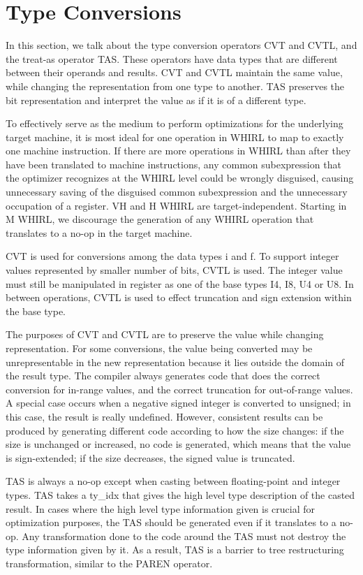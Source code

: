 \documentclass{article}
\begin{document}
\section{Type Conversions}

In this section, we talk about the type conversion operators CVT
and CVTL, and the treat-as operator TAS. These operators have data
types that are different between their operands and results.
CVT and CVTL maintain the same value, while changing the representation
from one type to another. TAS preserves the bit representation and
interpret the value as if it is of a different type.

To effectively serve as the medium to perform optimizations for
the underlying target machine, it is most ideal for one operation
in WHIRL to map to exactly one machine instruction. If there are
more operations in WHIRL than after they have been translated to
machine instructions, any common subexpression that the optimizer
recognizes at the WHIRL level could be wrongly disguised, causing
unnecessary saving of the disguised common subexpression and the
unnecessary occupation of a register. VH and H WHIRL are
target-independent. Starting in M WHIRL, we discourage the generation
of any WHIRL operation that translates to a no-op in the target
machine.

CVT is used for conversions among the data types i and f. To support
integer values represented by smaller number of bits,
CVTL is used. The integer value must still be manipulated in
register as one of the base types I4,
I8, U4 or U8. In between operations, CVTL is used to effect
truncation and sign extension within the base type.

The purposes of CVT and CVTL are to preserve the value while
changing representation. For some conversions, the value being
converted may be unrepresentable in the new representation because
it lies outside the domain of the result type. The compiler always
generates code that does the correct conversion for in-range values,
and the correct truncation for out-of-range values. A special case
occurs when a negative signed integer is converted to unsigned; in
this case, the result is really undefined. However, consistent
results can be produced by generating different code according to
how the size changes: if the size is unchanged or increased, no code
is generated, which means that the value is sign-extended; if the
size decreases, the signed value is truncated.


TAS is always a no-op except when casting between floating-point
and integer types.
TAS takes a ty\_idx that gives the high level type description of
the casted result. In cases where the high level type information given
is crucial for optimization purposes, the TAS should be generated
even if it translates to a no-op. Any transformation done to the
code around the TAS must not destroy the type information given by
it. As a result, TAS is a barrier to tree restructuring transformation,
similar to the PAREN operator.
\end{document}

